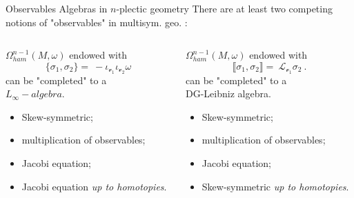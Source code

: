 \documentclass[handout,10pt]{beamer}
\providecommand{\vHam}{\mathscr{v}}
\begin{document}
\begin{frame}{Observables Algebras in $n$-plectic geometry}
	\alert{There are at least two competing notions of "observables" in multisym. geo. :}
	\vspace{-1em}
	\begin{columns}[T]
		\pause
		\setlength{\belowdisplayskip}{5pt}
		\begin{column}{.50\linewidth}
			\begin{thmblock}
				$\Omega^{n-1}_{ham}(M,\omega)$ endowed with
				\vspace{-.5em}
				\begin{displaymath}
					\lbrace \sigma_1, \sigma_2 \rbrace =			
					~ - \iota_{\vHam_1}\iota_{\vHam_2} \omega 
				\end{displaymath}			
				can be "completed" to a \\ $L_\infty-algebra$.
			\end{thmblock}
			\pause
			\begin{itemize}
				\item[\cmark] Skew-symmetric;
				\item[\xmark] multiplication of observables;
				\item[\xmark] Jacobi equation;
				\item[\smark] Jacobi equation \emph{up to homotopies}.
			\end{itemize}				
		\end{column}	
		\pause
		\begin{column}{.50\linewidth}
			\begin{thmblock}
				$\Omega^{n-1}_{ham}(M,\omega)$ endowed with
				\vspace{-.5em}
			\begin{displaymath}
				\llbracket \sigma_1, \sigma_2 \rrbracket =
				~ \mathcal{L}_{\vHam_1} \sigma_2
				~.					
			\end{displaymath}		
				can be "completed" to a \\ DG-Leibniz algebra.
			\end{thmblock}	
			\pause
			\begin{itemize}
				\item[\xmark] Skew-symmetric;
				\item[\xmark] multiplication of observables;
				\item[\cmark] Jacobi equation;
				\item[\smark] Skew-symmetric \emph{up to homotopies}.
			\end{itemize}	
		\end{column}	
	\end{columns}
	

\end{frame}
\end{document}
